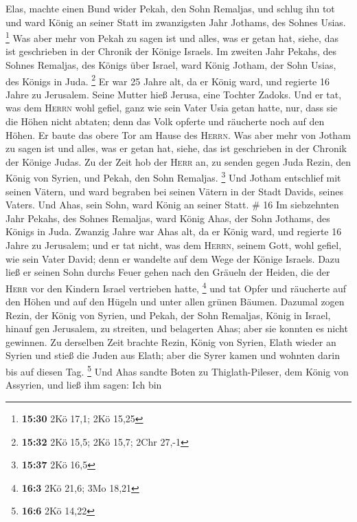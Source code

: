 Elas, machte einen Bund wider Pekah, den Sohn Remaljas, und schlug ihn
tot und ward König an seiner Statt im zwanzigsten Jahr Jothams, des
Sohnes Usias. \footnote{\textbf{15:30} 2Kö 17,1; 2Kö 15,25}
 Was aber mehr von Pekah zu sagen ist und alles, was er
getan hat, siehe, das ist geschrieben in der Chronik der Könige Israels.
 Im zweiten Jahr Pekahs, des Sohnes Remaljas, des Königs
über Israel, ward König Jotham, der Sohn Usias, des Königs in Juda.
\footnote{\textbf{15:32} 2Kö 15,5; 2Kö 15,7; 2Chr 27,-1} 
Er war 25 Jahre alt, da er König ward, und regierte 16 Jahre zu
Jerusalem. Seine Mutter hieß Jerusa, eine Tochter Zadoks.
 Und er tat, was dem \textsc{Herrn} wohl gefiel, ganz wie
sein Vater Usia getan hatte,  nur, dass sie die Höhen
nicht abtaten; denn das Volk opferte und räucherte noch auf den Höhen.
Er baute das obere Tor am Hause des \textsc{Herrn}.  Was
aber mehr von Jotham zu sagen ist und alles, was er getan hat, siehe,
das ist geschrieben in der Chronik der Könige Judas.  Zu
der Zeit hob der \textsc{Herr} an, zu senden gegen Juda Rezin, den König
von Syrien, und Pekah, den Sohn Remaljas. \footnote{\textbf{15:37} 2Kö
  16,5}  Und Jotham entschlief mit seinen Vätern, und
ward begraben bei seinen Vätern in der Stadt Davids, seines Vaters.
 Und Ahas, sein Sohn, ward König an seiner Statt. \# 16
 Im siebzehnten Jahr Pekahs, des Sohnes Remaljas, ward
König Ahas, der Sohn Jothams, des Königs in Juda.  Zwanzig
Jahre war Ahas alt, da er König ward, und regierte 16 Jahre zu
Jerusalem; und er tat nicht, was dem \textsc{Herrn}, seinem Gott, wohl
gefiel, wie sein Vater David;  denn er wandelte auf dem
Wege der Könige Israels. Dazu ließ er seinen Sohn durchs Feuer gehen
nach den Gräueln der Heiden, die der \textsc{Herr} vor den Kindern
Israel vertrieben hatte, \footnote{\textbf{16:3} 2Kö 21,6; 3Mo 18,21}
 und tat Opfer und räucherte auf den Höhen und auf den
Hügeln und unter allen grünen Bäumen.  Dazumal zogen
Rezin, der König von Syrien, und Pekah, der Sohn Remaljas, König in
Israel, hinauf gen Jerusalem, zu streiten, und belagerten Ahas; aber sie
konnten es nicht gewinnen.  Zu derselben Zeit brachte
Rezin, König von Syrien, Elath wieder an Syrien und stieß die Juden aus
Elath; aber die Syrer kamen und wohnten darin bis auf diesen Tag.
\footnote{\textbf{16:6} 2Kö 14,22}  Und Ahas sandte Boten
zu Thiglath-Pileser, dem König von Assyrien, und ließ ihm sagen: Ich bin
